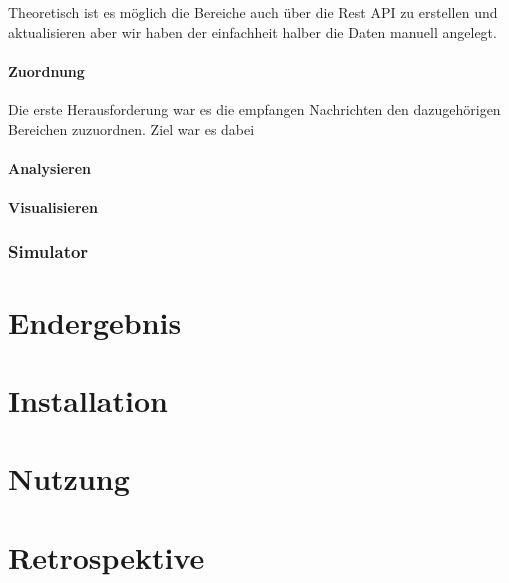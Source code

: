 \documentclass[report]{scrartcl}
\begin{document}
Theoretisch ist es möglich die Bereiche auch über die Rest API zu erstellen und
aktualisieren aber wir haben der einfachheit halber die Daten manuell angelegt.

\subsection{Zuordnung}

Die erste Herausforderung war es die empfangen Nachrichten den dazugehörigen
Bereichen zuzuordnen. Ziel war es dabei

\subsection{Analysieren}

\subsection{Visualisieren}


\section{Simulator}


\part{Endergebnis}
\part{Installation}
\part{Nutzung}
\part{Retrospektive}


\newpage
\nocite{*}
\printbibliography[heading=bibintoc, title={Literatur}]
\end{document}
